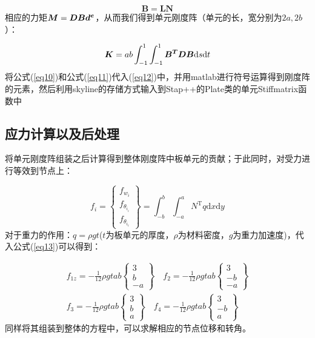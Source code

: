 \documentclass[forprint]{WHUBachelor}
\begin{document}
\begin{equation}
\bm{B}=\bm{LN}\label{eq11}
\end{equation}
相应的力矩$\text{\ensuremath{\bm{M}=\bm{DBd^{e}}}}$，从而我们得到单元刚度阵（单元的长，宽分别为$2a,2b$）：

\begin{equation}
\bm{K}=ab\int_{-1}^{1}\int_{-1}^{1}\bm{B^{T}DB}{\rm d}s{\rm d}t\label{eq12}
\end{equation}
将公式(\ref{eq10})和公式(\ref{eq11})代入(\ref{eq12})中，并用matlab进行符号运算得到刚度阵的元素，然后利用skyline的存储方式输入到Stap++的Plate类的单元Stiffmatrix函数中

\subsection{应力计算以及后处理}

将单元刚度阵组装之后计算得到整体刚度阵中板单元的贡献；于此同时，对受力进行等效到节点上：

\begin{equation}
f_{i}=\left\{ \begin{array}{l}
{f_{w_{i}}}\\
{f_{\theta_{i_{i}}}}\\
{f_{\theta_{i_{i}}}}
\end{array}\right\} =\int_{-b}^{b}\int_{-a}^{a}N^{\mathrm{T}}q\mathrm{d}x\mathrm{d}y\label{eq13}
\end{equation}
对于重力的作用：$q=\rho gt$($t$为板单元的厚度，$\rho$为材料密度，$g$为重力加速度)，代入公式(\ref{eq13})可以得到：

\begin{equation}
\begin{array}{l}
{f_{1z}=-\frac{1}{12}\rho gtab\left\{ \begin{array}{c}
{3}\\
{b}\\
{-a}
\end{array}\right\} \quad f_{2}=-\frac{1}{12}\rho gtab\left\{ \begin{array}{c}
{3}\\
{-b}\\
{-a}
\end{array}\right\} }\\
{f_{3}=-\frac{1}{12}\rho gtab\left\{ \begin{array}{l}
{3}\\
{b}\\
{a}
\end{array}\right\} \quad f_{4}=-\frac{1}{12}\rho gtab\left\{ \begin{array}{c}
{3}\\
{-b}\\
{a}
\end{array}\right\} }
\end{array}\label{eq14}
\end{equation}
同样将其组装到整体的方程中，可以求解相应的节点位移和转角。
\end{document}

